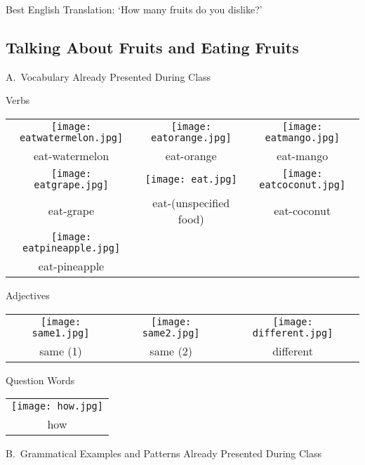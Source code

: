 \documentclass{tufte-book}
\begin{document}
Best English Translation: `How many fruits do you dislike?'
\newpage
\subsection{Talking About Fruits and Eating Fruits}

\noindent A.~Vocabulary Already Presented During Class

\vspace{0.25cm} \noindent Verbs

\begin{table*}[h!]
\begin{tabular}{c c c }
\texttt{[image: eatwatermelon.jpg]}&\texttt{[image: eatorange.jpg]}&\texttt{[image: eatmango.jpg]}\\
\footnotesize eat-watermelon & \footnotesize eat-orange & \footnotesize eat-mango\\
\texttt{[image: eatgrape.jpg]}&\texttt{[image: eat.jpg]}&\texttt{[image: eatcoconut.jpg]}\\
\footnotesize eat-grape & \footnotesize eat-(unspecified food) & \footnotesize eat-coconut\\
\texttt{[image: eatpineapple.jpg]}&&\\
\footnotesize eat-pineapple & &\\
\end{tabular}
\end{table*}

\vspace{0.25cm}\noindent Adjectives

\begin{table*}[h!]
\begin{tabular}{c c c }
\texttt{[image: same1.jpg]}&\texttt{[image: same2.jpg]}&\texttt{[image: different.jpg]}\\
\footnotesize same (1) & \footnotesize same (2) & \footnotesize different\\
\end{tabular}
\end{table*}

\vspace{0.25cm}\noindent Question Words

\begin{table*}[h!]
\begin{tabular}{c}
\texttt{[image: how.jpg]}\\
\footnotesize how \\
\end{tabular}
\end{table*}
\newpage
\noindent B.~Grammatical Examples and Patterns Already Presented During Class
\end{document}
